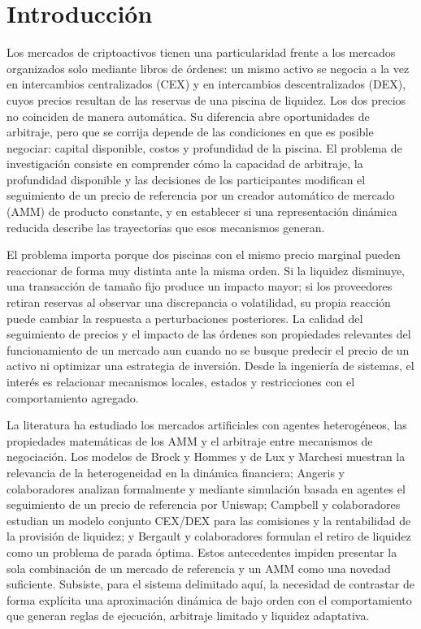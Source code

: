\chapter{Introducción}
\label{cap:introduccion}

Los mercados de criptoactivos tienen una particularidad frente a los mercados organizados solo mediante libros de órdenes: un mismo activo se negocia a la vez en intercambios centralizados (CEX) y en intercambios descentralizados (DEX), cuyos precios resultan de las reservas de una piscina de liquidez. Los dos precios no coinciden de manera automática. Su diferencia abre oportunidades de arbitraje, pero que se corrija depende de las condiciones en que es posible negociar: capital disponible, costos y profundidad de la piscina. El problema de investigación consiste en comprender cómo la capacidad de arbitraje, la profundidad disponible y las decisiones de los participantes modifican el seguimiento de un precio de referencia por un creador automático de mercado (AMM) de producto constante, y en establecer si una representación dinámica reducida describe las trayectorias que esos mecanismos generan.

El problema importa porque dos piscinas con el mismo precio marginal pueden reaccionar de forma muy distinta ante la misma orden. Si la liquidez disminuye, una transacción de tamaño fijo produce un impacto mayor; si los proveedores retiran reservas al observar una discrepancia o volatilidad, su propia reacción puede cambiar la respuesta a perturbaciones posteriores. La calidad del seguimiento de precios y el impacto de las órdenes son propiedades relevantes del funcionamiento de un mercado aun cuando no se busque predecir el precio de un activo ni optimizar una estrategia de inversión. Desde la ingeniería de sistemas, el interés es relacionar mecanismos locales, estados y restricciones con el comportamiento agregado.

La literatura ha estudiado los mercados artificiales con agentes heterogéneos, las propiedades matemáticas de los AMM y el arbitraje entre mecanismos de negociación. Los modelos de Brock y Hommes \cite{brock1998heterogeneous} y de Lux y Marchesi \cite{lux1999scaling} muestran la relevancia de la heterogeneidad en la dinámica financiera; Angeris y colaboradores \cite{angeris2020uniswap} analizan formalmente y mediante simulación basada en agentes el seguimiento de un precio de referencia por Uniswap; Campbell y colaboradores \cite{campbell2025optimal} estudian un modelo conjunto CEX/DEX para las comisiones y la rentabilidad de la provisión de liquidez; y Bergault y colaboradores \cite{bergault2025exit} formulan el retiro de liquidez como un problema de parada óptima. Estos antecedentes impiden presentar la sola combinación de un mercado de referencia y un AMM como una novedad suficiente. Subsiste, para el sistema delimitado aquí, la necesidad de contrastar de forma explícita una aproximación dinámica de bajo orden con el comportamiento que generan reglas de ejecución, arbitraje limitado y liquidez adaptativa.

